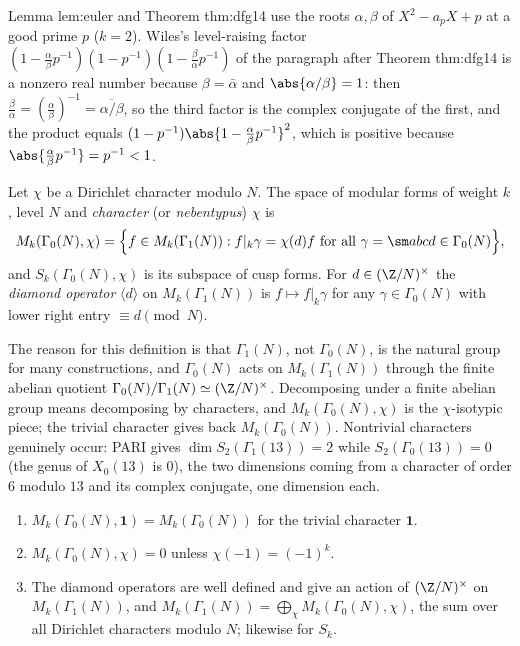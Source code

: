 \begin{paperlink}\label{pl:modforms:ramanujan}
Lemma lem:euler and Theorem thm:dfg14 use the roots $\alpha,\beta$ of $X^2-a_pX+p$ at a good prime $p$ ($k=2$). Wiles's
level-raising factor $(1-\frac\alpha\beta p^{-1})(1-p^{-1})(1-\frac\beta\alpha p^{-1})$ of the paragraph after Theorem thm:dfg14 is a nonzero real number because $\beta=\bar\alpha$ and
$\abs{\alpha/\beta}=1$: then $\frac\beta\alpha=(\frac\alpha\beta)^{-1}=\overline{\alpha/\beta}$, so the third factor is the complex conjugate of the first, and the product equals
$(1-p^{-1})\abs{1-\frac\alpha\beta p^{-1}}^2$, which is positive because $\abs{\frac\alpha\beta p^{-1}}=p^{-1}<1$.
\end{paperlink}

\begin{definition}[nebentypus]\label{def:modforms:nebentypus}
Let $\chi$ be a Dirichlet character modulo $N$. The space of modular forms of weight $k$, level $N$ and \emph{character} (or \emph{nebentypus}) $\chi$ is
\[
M_k(\Gamma_0(N),\chi)=\Bigl\{f\in M_k(\Gamma_1(N)):f|_k\gamma=\chi(d)f\ \text{for all }\gamma=\sm abcd\in\Gamma_0(N)\Bigr\},
\]
and $S_k(\Gamma_0(N),\chi)$ is its subspace of cusp forms. For $d\in(\Z/N)^\times$ the \emph{diamond operator} $\langle d\rangle$ on $M_k(\Gamma_1(N))$ is $f\mapsto f|_k\gamma$ for any
$\gamma\in\Gamma_0(N)$ with lower right entry $\equiv d\pmod N$.
\end{definition}

The reason for this definition is that $\Gamma_1(N)$, not $\Gamma_0(N)$, is the natural group for many constructions, and $\Gamma_0(N)$ acts on $M_k(\Gamma_1(N))$ through the finite
abelian quotient $\Gamma_0(N)/\Gamma_1(N)\simeq(\Z/N)^\times$. Decomposing under a finite abelian group means decomposing by characters, and $M_k(\Gamma_0(N),\chi)$ is the
$\chi$-isotypic piece; the trivial character gives back $M_k(\Gamma_0(N))$. Nontrivial characters genuinely occur: PARI gives $\dim S_2(\Gamma_1(13))=2$ while
$S_2(\Gamma_0(13))=0$ (the genus of $X_0(13)$ is $0$), the two dimensions coming from a character of order $6$ modulo $13$ and its complex conjugate, one dimension each.

\begin{proposition}\label{prop:modforms:nebentypus}
\begin{enumerate}[label=(\roman*)]
\item $M_k(\Gamma_0(N),\mathbf 1)=M_k(\Gamma_0(N))$ for the trivial character $\mathbf 1$.
\item $M_k(\Gamma_0(N),\chi)=0$ unless $\chi(-1)=(-1)^k$.
\item The diamond operators are well defined and give an action of $(\Z/N)^\times$ on $M_k(\Gamma_1(N))$, and
$M_k(\Gamma_1(N))=\bigoplus_\chi M_k(\Gamma_0(N),\chi)$, the sum over all Dirichlet characters modulo $N$; likewise for $S_k$.
\end{enumerate}
\end{proposition}

